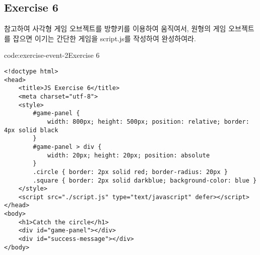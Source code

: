 \subsection*{Exercise 6}

\를 참고하여 사각형 게임 오브젝트를 방향키를 이용하여 움직여서, 원형의 게임 오브젝트를 잡으면 이기는 간단한 게임을 script.js를 작성하여 완성하여라.

\begin{codeenv}{code:exercise-event-2}{Exercise 6}\begin{verbatim}
<!doctype html>
<head>
    <title>JS Exercise 6</title>
    <meta charset="utf-8">
    <style>
        #game-panel {
            width: 800px; height: 500px; position: relative; border: 4px solid black
        }
        #game-panel > div {
            width: 20px; height: 20px; position: absolute
        }
        .circle { border: 2px solid red; border-radius: 20px }
        .square { border: 2px solid darkblue; background-color: blue }
    </style>
    <script src="./script.js" type="text/javascript" defer></script>
</head>
<body>
    <h1>Catch the circle</h1>
    <div id="game-panel"></div>
    <div id="success-message"></div>
</body>
\end{verbatim}
\end{codeenv}

